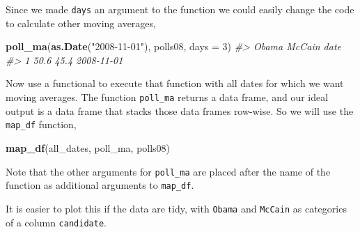 \documentclass[]{book}
\newenvironment{Shaded}{\begin{snugshade}}{\end{snugshade}}
\newcommand{\KeywordTok}[1]{\textcolor[rgb]{0.13,0.29,0.53}{\textbf{#1}}}
\newcommand{\DataTypeTok}[1]{\textcolor[rgb]{0.13,0.29,0.53}{#1}}
\newcommand{\DecValTok}[1]{\textcolor[rgb]{0.00,0.00,0.81}{#1}}
\newcommand{\StringTok}[1]{\textcolor[rgb]{0.31,0.60,0.02}{#1}}
\newcommand{\CommentTok}[1]{\textcolor[rgb]{0.56,0.35,0.01}{\textit{#1}}}
\newcommand{\OtherTok}[1]{\textcolor[rgb]{0.56,0.35,0.01}{#1}}
\newcommand{\OperatorTok}[1]{\textcolor[rgb]{0.81,0.36,0.00}{\textbf{#1}}}
\newcommand{\NormalTok}[1]{#1}
\theoremstyle{definition}
\theoremstyle{definition}
\theoremstyle{definition}
\theoremstyle{remark}
\begin{document}
Since we made \texttt{days} an argument to the function we could easily
change the code to calculate other moving averages,

\begin{Shaded}
\begin{Highlighting}[]
\KeywordTok{poll_ma}\NormalTok{(}\KeywordTok{as.Date}\NormalTok{(}\StringTok{"2008-11-01"}\NormalTok{), polls08, }\DataTypeTok{days =} \DecValTok{3}\NormalTok{)}
\CommentTok{#>   Obama McCain       date}
\CommentTok{#> 1  50.6   45.4 2008-11-01}
\end{Highlighting}
\end{Shaded}

Now use a functional to execute that function with all dates for which
we want moving averages. The function \texttt{poll\_ma} returns a data
frame, and our ideal output is a data frame that stacks those data
frames row-wise. So we will use the \texttt{map\_df} function,

\begin{Shaded}
\begin{Highlighting}[]
\KeywordTok{map_df}\NormalTok{(all_dates, poll_ma, polls08)}
\end{Highlighting}
\end{Shaded}

Note that the other arguments for \texttt{poll\_ma} are placed after the
name of the function as additional arguments to \texttt{map\_df}.

It is easier to plot this if the data are tidy, with \texttt{Obama} and
\texttt{McCain} as categories of a column \texttt{candidate}.

\begin{Shaded}
\end{Shaded}
\end{document}
